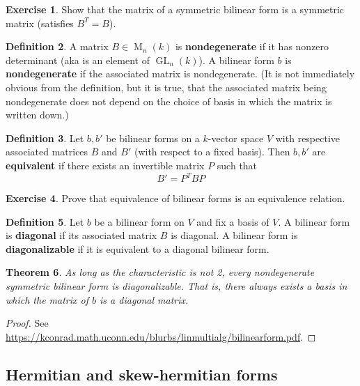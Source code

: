 \documentclass[12pt]{article}
\newtheorem{theorem}{Theorem}
\theoremstyle{definition}
\newtheorem{definition}[theorem]{Definition}
\newtheorem{exercise}[theorem]{Exercise}
\newcommand{\tbf}{\textbf}
\DeclareMathOperator{\M}{M}
\DeclareMathOperator{\GL}{GL}
\begin{document}
\begin{exercise}
Show that the matrix of a symmetric bilinear form is a symmetric matrix (satisfies $B^T = B$).
\end{exercise}

\begin{definition}
A matrix $B \in \M_n(k)$ is \tbf{nondegenerate} if it has nonzero determinant (aka is an element of $\GL_n(k)$). A bilinear form $b$ is \tbf{nondegenerate} if the associated matrix is nondegenerate. (It is not immediately obvious from the definition, but it is true, that the associated matrix being nondegenerate does not depend on the choice of basis in which the matrix is written down.)
\end{definition}

\begin{definition}
Let $b, b'$ be bilinear forms on a $k$-vector space $V$ with respective associated matrices $B$ and $B'$ (with respect to a fixed basis). Then $b,b'$ are \tbf{equivalent} if there exists an invertible matrix $P$ such that
\[
	B' = P^T B P
\]
\end{definition}

\begin{exercise}
Prove that equivalence of bilinear forms is an equivalence relation.
\end{exercise}

\begin{definition}
Let $b$ be a bilinear form on $V$ and fix a basis of $V$. A bilinear form is \tbf{diagonal} if its associated matrix $B$ is diagonal. A bilinear form is \tbf{diagonalizable} if it is equivalent to a diagonal bilinear form. 
\end{definition}

\begin{theorem}
\label{nondegenerate symmetric form is diagonal}
As long as the characteristic is not 2, every nondegenerate symmetric bilinear form is diagonalizable. That is, there always exists a basis in which the matrix of $b$ is a diagonal matrix.
\end{theorem}
\begin{proof}
See \url{https://kconrad.math.uconn.edu/blurbs/linmultialg/bilinearform.pdf}.
\end{proof}

\subsection{Hermitian and skew-hermitian forms}
\end{document}
